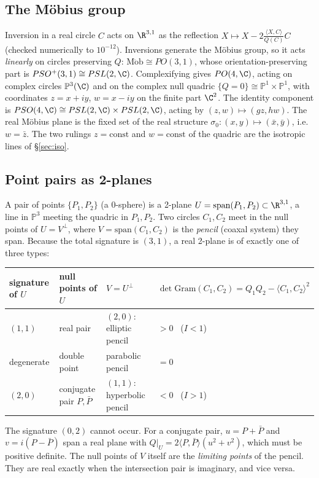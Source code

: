 \subsection{The Möbius group}
Inversion in a real circle $C$ acts on $\R^{3,1}$ as the reflection $X\mapsto X-2\frac{\langle X,C\rangle}{Q(C)}C$ (checked numerically to $10^{-12}$). Inversions generate the Möbius group, so it acts \emph{linearly} on circles preserving $Q$: $\mathrm{M\ddot ob}\cong PO(3,1)$, whose orientation-preserving part is $PSO^+(3,1)\cong PSL(2,\C)$. Complexifying gives $PO(4,\C)$, acting on complex circles $\mathbb{P}^3(\C)$ and on the complex null quadric $\{Q=0\}\cong\mathbb{P}^1\times\mathbb{P}^1$, with coordinates $z=x+iy$, $w=x-iy$ on the finite part $\C^2$. The identity component is $PSO(4,\C)\cong PSL(2,\C)\times PSL(2,\C)$, acting by $(z,w)\mapsto(g z,h w)$. The real Möbius plane is the fixed set of the real structure $\sigma_0:(x,y)\mapsto(\bar x,\bar y)$, i.e.\ $w=\bar z$. The two rulings $z=\mathrm{const}$ and $w=\mathrm{const}$ of the quadric are the isotropic lines of \S\ref{sec:iso}.

\subsection{Point pairs as 2-planes}
A pair of points $\{P_1,P_2\}$ (a $0$-sphere) is a 2-plane $U=\mathrm{span}(P_1,P_2)\subset\R^{3,1}$, a line in $\mathbb{P}^3$ meeting the quadric in $P_1,P_2$. Two circles $C_1,C_2$ meet in the null points of $U=V^\perp$, where $V=\mathrm{span}(C_1,C_2)$ is the \emph{pencil} (coaxal system) they span. Because the total signature is $(3,1)$, a real 2-plane is of exactly one of three types:
\begin{center}\begin{tabular}{llll}
signature of $U$ & null points of $U$ & $V=U^\perp$ & $\det\mathrm{Gram}(C_1,C_2)=Q_1Q_2-\langle C_1,C_2\rangle^2$\\\hline
$(1,1)$ & real pair & $(2,0)$: elliptic pencil & $>0$ \ ($I<1$)\\
degenerate & double point & parabolic pencil & $=0$\\
$(2,0)$ & conjugate pair $P,\bar P$ & $(1,1)$: hyperbolic pencil & $<0$ \ ($I>1$)
\end{tabular}\end{center}
The signature $(0,2)$ cannot occur. For a conjugate pair, $u=P+\bar P$ and $v=i(P-\bar P)$ span a real plane with $Q|_U=2\langle P,\bar P\rangle(u^2+v^2)$, which must be positive definite. The null points of $V$ itself are the \emph{limiting points} of the pencil. They are real exactly when the intersection pair is imaginary, and vice versa.

